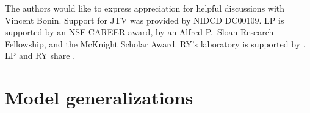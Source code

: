 The authors would like to express appreciation for helpful discussions with Vincent Bonin.  Support for JTV was provided by NIDCD DC00109. LP is supported by an NSF CAREER award, by an Alfred P.\ Sloan Research Fellowship, and the McKnight Scholar Award. RY's laboratory is supported by .  LP and RY share .


%
%

%


\appendix


\section{Model generalizations} \label{sec:model2}


% 
% 
% 
% 
% 
% 
% 


